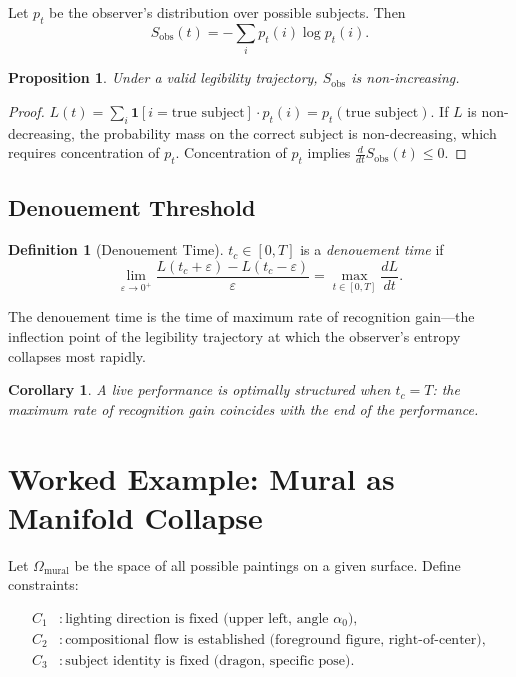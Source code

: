 \documentclass[11pt, twoside]{article}
\theoremstyle{plain}
\newtheorem{proposition}[theorem]{Proposition}
\newtheorem{corollary}[theorem]{Corollary}
\theoremstyle{definition}
\newtheorem{definition}[theorem]{Definition}
\theoremstyle{remark}
\begin{document}
Let $p_t$ be the observer's distribution over possible subjects. Then
\[
S_{\text{obs}}(t) = -\sum_i p_t(i) \log p_t(i).
\]

\begin{proposition}
Under a valid legibility trajectory, $S_{\text{obs}}$ is non-increasing.
\end{proposition}

\begin{proof}
$L(t) = \sum_i \mathbf{1}[i = \text{true subject}] \cdot p_t(i) = p_t(\text{true subject})$. If $L$ is non-decreasing, the probability mass on the correct subject is non-decreasing, which requires concentration of $p_t$. Concentration of $p_t$ implies $\frac{d}{dt} S_{\text{obs}}(t) \leq 0$.
\end{proof}

\subsection{Denouement Threshold}

\begin{definition}[Denouement Time]
$t_c \in [0, T]$ is a \emph{denouement time} if
\[
\lim_{\varepsilon \to 0^+} \frac{L(t_c + \varepsilon) - L(t_c - \varepsilon)}{\varepsilon} = \max_{t \in [0,T]} \frac{dL}{dt}.
\]
\end{definition}

The denouement time is the time of maximum rate of recognition gain---the inflection point of the legibility trajectory at which the observer's entropy collapses most rapidly.

\begin{corollary}
A live performance is optimally structured when $t_c = T$: the maximum rate of recognition gain coincides with the end of the performance.
\end{corollary}

\section{Worked Example: Mural as Manifold Collapse}
\label{app:mural}

Let $\Omega_{\text{mural}}$ be the space of all possible paintings on a given surface. Define constraints:

\begin{align*}
C_1 &: \text{lighting direction is fixed (upper left, angle } \alpha_0\text{)}, \\
C_2 &: \text{compositional flow is established (foreground figure, right-of-center)}, \\
C_3 &: \text{subject identity is fixed (dragon, specific pose)}.
\end{align*}
\end{document}
